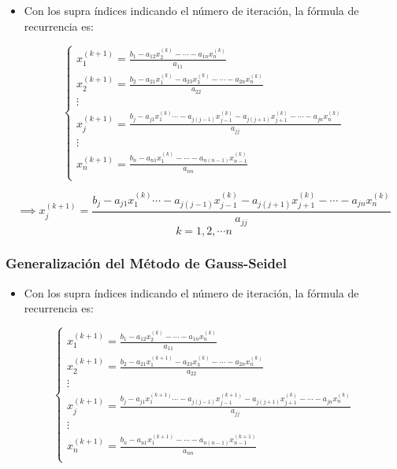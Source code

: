 \documentclass[]{book}
\providecommand{\tightlist}{%
  \setlength{\itemsep}{0pt}\setlength{\parskip}{0pt}}
\begin{document}
\begin{itemize}
\tightlist
\item
  Con los supra índices indicando el número de iteración, la fórmula de recurrencia es:
\end{itemize}

\[
\begin{cases} 
x_1^{(k+1)} = \frac{b_1 - a_{12}x_2^{(k)} - \cdots - a_{1n}x_n^{(k)}}{ a_{11}}\\
x_2^{(k+1)} = \frac{b_2 - a_{21}x_1^{(k)} - a_{23}x_3^{(k)} - \cdots - a_{2n}x_n^{(k)}}{ a_{22}}\\
\vdots \\
x_j^{(k+1)} = \frac{b_j - a_{j1}x_1^{(k)} \cdots - a_{j(j-1)}x_{j-1}^{(k)} - a_{j(j+1)}x_{j+1}^{(k)} - \cdots - a_{jn}x_n^{(k)}}{ a_{jj}}\\
\vdots \\
x_n^{(k+1)} = \frac{b_n - a_{n1}x_1^{(k)} - \cdots - a_{n(n-1)}x_{n-1}^{(k)}}{a_{nn}}\\
\end{cases}
\]

\[
\implies
x_j^{(k+1)} = \frac{b_j - a_{j1}x_1^{(k)} \cdots - a_{j(j-1)}x_{j-1}^{(k)} - a_{j(j+1)}x_{j+1}^{(k)} - \cdots - a_{jn}x_n^{(k)}}{ a_{jj}}
\]
\[
k=1, 2, \cdots n
\]

\hypertarget{generalizaciuxf3n-del-muxe9todo-de-gauss-seidel}{%
\subsubsection{Generalización del Método de Gauss-Seidel}\label{generalizaciuxf3n-del-muxe9todo-de-gauss-seidel}}

\begin{itemize}
\tightlist
\item
  Con los supra índices indicando el número de iteración, la fórmula de recurrencia es:
\end{itemize}

\[
\begin{cases} 
x_1^{(k+1)} = \frac{b_1 - a_{12}x_2^{(k)} - \cdots - a_{1n}x_n^{(k)}}{ a_{11}}\\
x_2^{(k+1)} = \frac{b_2 - a_{21}x_1^{(k+1)} - a_{23}x_3^{(k)} - \cdots - a_{2n}x_n^{(k)}}{ a_{22}}\\
\vdots \\
x_j^{(k+1)} = \frac{b_j - a_{j1}x_1^{(k+1)} \cdots - a_{j(j-1)}x_{j-1}^{(k+1)} - a_{j(j+1)}x_{j+1}^{(k)} - \cdots - a_{jn}x_n^{(k)}}{ a_{jj}}\\
\vdots \\
x_n^{(k+1)} = \frac{b_n - a_{n1}x_1^{(k+1)} - \cdots - a_{n(n-1)}x_{n-1}^{(k+1)}}{a_{nn}}\\
\end{cases}
\]
\end{document}
